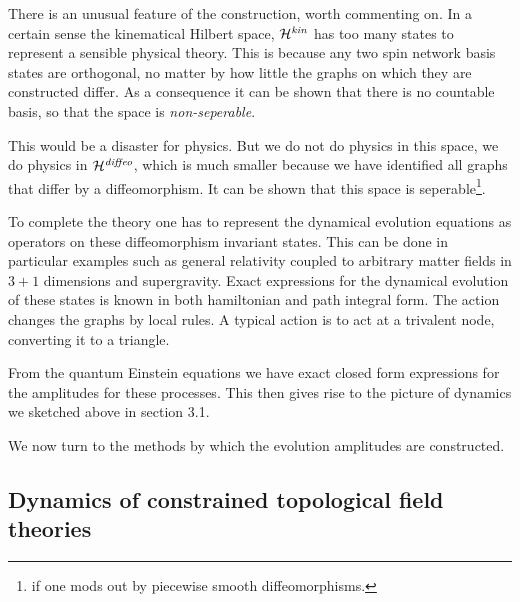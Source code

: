 \documentclass[12pt]{article}
\begin{document}
There is an unusual feature of the construction, worth commenting on.
In a certain sense the kinematical Hilbert space, ${\cal H}^{\it kin}$ has
too many states to represent a sensible physical theory. This is because
any two spin network basis states are orthogonal, no matter by how little
the graphs on which they are constructed differ.  As a consequence it
can be shown that there is no countable basis, so that the space is
{\it non-seperable}.  

This would be a disaster for physics. But we do not do physics in this space,
we do physics in ${\cal H}^{\it diffeo}$, which is much smaller because we
have identified all graphs that differ by a diffeomorphism.  It can be shown
that this space is seperable\footnote{if one mods out by piecewise smooth
diffeomorphisms.}.  

To complete the theory one has to represent   the dynamical evolution equations  
as operators on  these 
diffeomorphism invariant states.   
This can be done in particular examples such as general relativity coupled to arbitrary 
matter fields in $3+1$ dimensions and supergravity.   Exact expressions for the 
dynamical evolution of these states is known in both hamiltonian and path integral form. 
The action changes the graphs by local rules.  A typical action is to act at a trivalent node, converting it to a triangle. 


From the quantum Einstein equations we have exact 
closed form expressions for the 
amplitudes for these processes. This then 
gives rise to the picture of
dynamics we sketched above in section 3.1. 



We now turn to the methods by which the evolution amplitudes are constructed. 



\subsection{Dynamics of constrained topological field theories}
\end{document}
